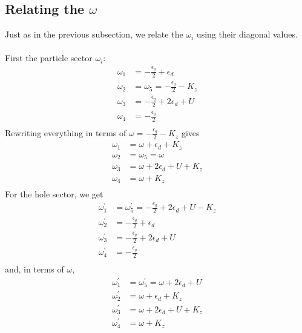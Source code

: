 \documentclass[twoside]{report}
\numberwithin{equation}{section}
\begin{document}
\subsection{Relating the \(\omega\)}
Just as in the previous subsection, we relate the \(\omega_i\) using their diagonal values.
\\\\First the particle sector \(\omega_i\):
\begin{equation}\begin{aligned}
	\omega_1 &= -\frac{\epsilon_q}{2} + \epsilon_d\\
	\omega_2 &= \omega_5 = -\frac{\epsilon_q}{2} - K_z\\
	\omega_3 &= -\frac{\epsilon_q}{2} + 2\epsilon_d + U\\
	\omega_4 &= -\frac{\epsilon_q}{2}\\
\end{aligned}\end{equation}
Rewriting everything in terms of \(\omega = -\frac{\epsilon_q}{2} - K_z\) gives
\begin{equation}\begin{aligned}
	\omega_1 &= \omega + \epsilon_d + K_z\\
	\omega_2 &= \omega_5 = \omega\\
	\omega_3 &= \omega + 2\epsilon_d + U + K_z\\
	\omega_4 &= \omega + K_z\\
\end{aligned}\end{equation}
For the hole sector, we get
\begin{equation}\begin{aligned}
	\omega^\prime_1 &= \omega_5^\prime = -\frac{\epsilon_q}{2} + 2\epsilon_d + U - K_z\\
	\omega^\prime_2 &= -\frac{\epsilon_q}{2} + \epsilon_d\\
	\omega_3^\prime &= -\frac{\epsilon_q}{2} + 2\epsilon_d + U\\
	\omega^\prime_4 &= -\frac{\epsilon_q}{2}\\
\end{aligned}\end{equation}
and, in terms of \(\omega\),
\begin{equation}\begin{aligned}
	\omega^\prime_1 &= \omega_5^\prime = \omega + 2\epsilon_d + U\\
	\omega^\prime_2 &= \omega + \epsilon_d + K_z\\
	\omega_3^\prime &= \omega + 2\epsilon_d + U + K_z\\
	\omega^\prime_4 &= \omega + K_z\\
\end{aligned}\end{equation}
\end{document}
